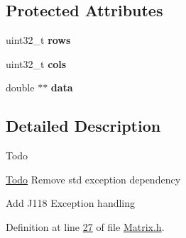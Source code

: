 \subsection*{Protected Attributes}
\begin{DoxyCompactItemize}
\item 
\hypertarget{class_j118_1_1_math_1_1_matrix_a07543b5e05565f1a15959ad102b69f31}{}uint32\+\_\+t {\bfseries rows}\label{class_j118_1_1_math_1_1_matrix_a07543b5e05565f1a15959ad102b69f31}

\item 
\hypertarget{class_j118_1_1_math_1_1_matrix_a90a96ca74794c8f6469394ab5c6e27d2}{}uint32\+\_\+t {\bfseries cols}\label{class_j118_1_1_math_1_1_matrix_a90a96ca74794c8f6469394ab5c6e27d2}

\item 
\hypertarget{class_j118_1_1_math_1_1_matrix_a3045ee16453ba4594ff49cc2f98e68c7}{}double $\ast$$\ast$ {\bfseries data}\label{class_j118_1_1_math_1_1_matrix_a3045ee16453ba4594ff49cc2f98e68c7}

\end{DoxyCompactItemize}


\subsection{Detailed Description}
\begin{DoxyRefDesc}{Todo}
\item[\hyperlink{todo__todo000001}{Todo}]Remove std exception dependency 

Add J118 Exception handling \end{DoxyRefDesc}


Definition at line \hyperlink{_matrix_8h_source_l00027}{27} of file \hyperlink{_matrix_8h_source}{Matrix.\+h}.

